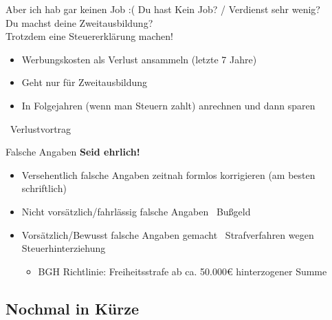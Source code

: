 \documentclass{beamer}
\begin{document}
			\begin{frame}{Aber ich hab gar keinen Job :(}
				Du hast Kein Job? / Verdienst sehr wenig?\\\pause
				Du machst deine Zweitausbildung?\\\pause
				Trotzdem eine Steuererklärung machen!\n\pause
				\begin{itemize}
					\item Werbungskosten als Verlust ansammeln (letzte 7 Jahre)
					\item Geht nur für Zweitausbildung
					\item In Folgejahren (wenn man Steuern zahlt) anrechnen und dann sparen
				\end{itemize}\n
				\textrightarrow\ Verlustvortrag
			\end{frame}
		
			\begin{frame}{Falsche Angaben}
				\textbf{Seid ehrlich!}\n
				\begin{itemize}
					\item Versehentlich falsche Angaben zeitnah formlos korrigieren (am besten schriftlich)
					\item Nicht vorsätzlich/fahrlässig falsche Angaben \textrightarrow\ Bußgeld
					\item Vorsätzlich/Bewusst falsche Angaben gemacht \textrightarrow\ Strafverfahren wegen Steuerhinterziehung
					\begin{itemize}
						\item BGH Richtlinie: Freiheitsstrafe ab ca. 50.000€ hinterzogener Summe
					\end{itemize}
				\end{itemize}
			\end{frame}
		
		\subsection{Nochmal in Kürze}
		
\end{document}
